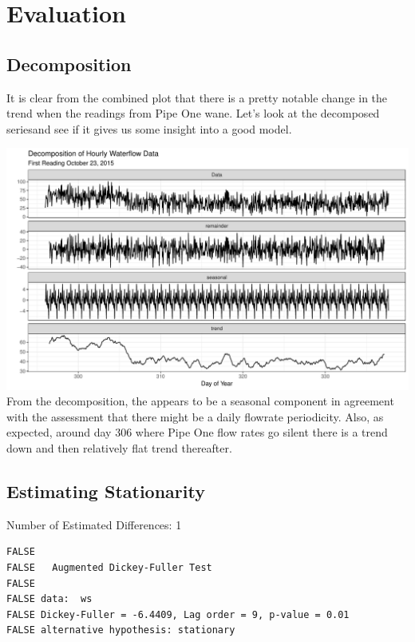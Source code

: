 \documentclass[openany]{book}
\begin{document}
\hypertarget{evaluation-2}{%
\section{Evaluation}\label{evaluation-2}}

\hypertarget{decomposition}{%
\subsection{Decomposition}\label{decomposition}}

It is clear from the combined plot that there is a pretty notable change
in the trend when the readings from Pipe One wane. Let's look at the
decomposed seriesand see if it gives us some insight into a good model.

\includegraphics{Group2_Project1_Fall2019_files/figure-latex/unnamed-chunk-18-1.pdf}
From the decomposition, the appears to be a seasonal component in
agreement with the assessment that there might be a daily flowrate
periodicity. Also, as expected, around day 306 where Pipe One flow rates
go silent there is a trend down and then relatively flat trend
thereafter.

\hypertarget{estimating-stationarity}{%
\subsection{Estimating Stationarity}\label{estimating-stationarity}}

Number of Estimated Differences: 1

\begin{verbatim}
FALSE 
FALSE   Augmented Dickey-Fuller Test
FALSE 
FALSE data:  ws
FALSE Dickey-Fuller = -6.4409, Lag order = 9, p-value = 0.01
FALSE alternative hypothesis: stationary
\end{verbatim}
\end{document}
